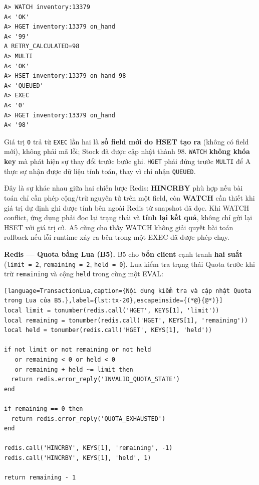\begingroup
{}\label{result:tx-14}
\nopagebreak[4]
\begin{Verbatim}
A> WATCH inventory:13379
A< 'OK'
A> HGET inventory:13379 on_hand
A< '99'
A RETRY_CALCULATED=98
A> MULTI
A< 'OK'
A> HSET inventory:13379 on_hand 98
A< 'QUEUED'
A> EXEC
A< '0'
A> HGET inventory:13379 on_hand
A< '98'
\end{Verbatim}
\endgroup\par\smallskip
Giá trị \texttt{0} trả từ \texttt{EXEC} lần hai là \textbf{số field mới do HSET tạo ra} (không có field mới), không phải mã lỗi; Stock đã được cập nhật thành 98. \texttt{WATCH} \textbf{không khóa key} mà phát hiện sự thay đổi trước bước ghi. \texttt{HGET} phải đứng trước \texttt{MULTI} để A thực sự nhận được dữ liệu tính toán, thay vì chỉ nhận \texttt{QUEUED}.

Đây là sự khác nhau giữa hai chiến lược Redis: \textbf{HINCRBY} phù hợp nếu bài toán chỉ cần phép cộng/trừ nguyên tử trên một field, còn \textbf{WATCH} cần thiết khi giá trị dự định ghi được tính bên ngoài Redis từ snapshot đã đọc. Khi WATCH conflict, ứng dụng phải đọc lại trạng thái và \textbf{tính lại kết quả}, không chỉ gửi lại HSET với giá trị cũ. A5 cũng cho thấy WATCH không giải quyết bài toán rollback nếu lỗi runtime xảy ra bên trong một EXEC đã được phép chạy.

\textbf{Redis — Quota bằng Lua (B5).} B5 cho \textbf{bốn client} cạnh tranh \textbf{hai suất} (\texttt{limit =\allowbreak{} 2}, \texttt{remaining =\allowbreak{} 2}, \texttt{held =\allowbreak{} 0}). Lua kiểm tra trạng thái Quota trước khi trừ \texttt{remaining} và cộng \texttt{held} trong cùng một EVAL:

\begin{lstlisting}[language=TransactionLua,caption={Nội dung kiểm tra và cập nhật Quota trong Lua của B5.},label={lst:tx-20},escapeinside={(*@}{@*)}]
local limit = tonumber(redis.call('HGET', KEYS[1], 'limit'))
local remaining = tonumber(redis.call('HGET', KEYS[1], 'remaining'))
local held = tonumber(redis.call('HGET', KEYS[1], 'held'))

if not limit or not remaining or not held
   or remaining < 0 or held < 0
   or remaining + held ~= limit then
  return redis.error_reply('INVALID_QUOTA_STATE')
end

if remaining == 0 then
  return redis.error_reply('QUOTA_EXHAUSTED')
end

redis.call('HINCRBY', KEYS[1], 'remaining', -1)
redis.call('HINCRBY', KEYS[1], 'held', 1)

return remaining - 1
\end{lstlisting}

